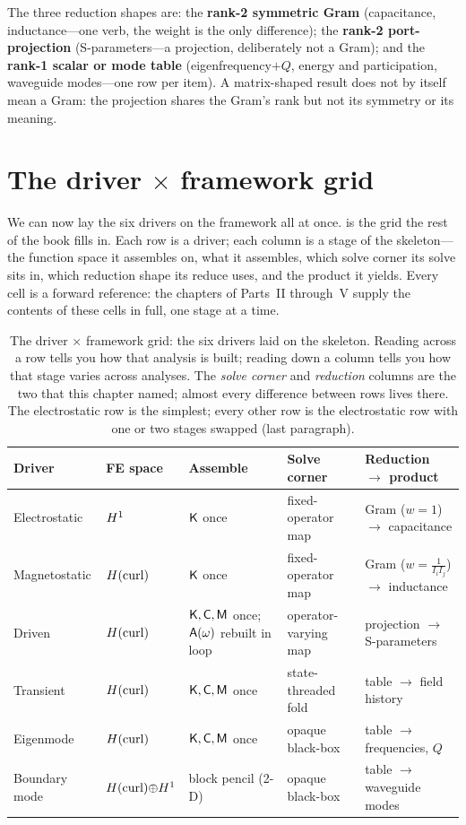 \begin{keyidea}
The three reduction shapes are: the \textbf{rank-2 symmetric Gram} (capacitance,
inductance---one verb, the weight is the only difference); the \textbf{rank-2
port-projection} (S-parameters---a projection, deliberately not a Gram); and the
\textbf{rank-1 scalar or mode table} (eigenfrequency$+Q$, energy and
participation, waveguide modes---one row per item). A matrix-shaped result does
not by itself mean a Gram: the projection shares the Gram's rank but not its
symmetry or its meaning.
\end{keyidea}

\section{The driver \texorpdfstring{$\times$}{x} framework grid}

We can now lay the six drivers on the framework all at once. 
is the grid the rest of the book fills in. Each row is a driver; each column is
a stage of the skeleton---the function space it assembles on, what it assembles,
which solve corner its solve sits in, which reduction shape its reduce uses, and
the product it yields. Every cell is a forward reference: the chapters of
Parts~II through~V supply the contents of these cells in full, one stage at a
time.

\begin{table}[t]
\centering
\caption[The driver $\times$ framework grid]{The driver $\times$ framework grid:
the six drivers laid on the skeleton. Reading across a row tells you how that
analysis is built; reading down a column tells you how that stage varies across
analyses. The \emph{solve corner} and \emph{reduction} columns are the two that
this chapter named; almost every difference between rows lives there. The
electrostatic row is the simplest; every other row is the electrostatic row
with one or two stages swapped (last paragraph).}
\label{tab:grid}
\footnotesize
\setlength{\tabcolsep}{3.5pt}
\renewcommand{\arraystretch}{1.3}
\begin{tabular}{@{}llp{27mm}ll@{}}
\toprule
Driver & FE space & \multicolumn{1}{l}{Assemble} & Solve corner & Reduction $\to$ product \\
\midrule
Electrostatic & $H^1$ & $\mathsf{K}$ once
  & fixed-operator map & Gram ($w{=}1$) $\to$ capacitance \\
Magnetostatic & $H(\mathrm{curl})$ & $\mathsf{K}$ once
  & fixed-operator map & Gram ($w{=}\tfrac{1}{I_iI_j}$) $\to$ inductance \\
Driven & $H(\mathrm{curl})$ & $\mathsf{K},\mathsf{C},\mathsf{M}$ once; $\mathsf{A}(\omega)$ rebuilt in loop
  & operator-varying map & projection $\to$ S-parameters \\
Transient & $H(\mathrm{curl})$ & $\mathsf{K},\mathsf{C},\mathsf{M}$ once
  & state-threaded fold & table $\to$ field history \\
Eigenmode & $H(\mathrm{curl})$ & $\mathsf{K},\mathsf{C},\mathsf{M}$ once
  & opaque black-box & table $\to$ frequencies, $Q$ \\
Boundary mode & $H(\mathrm{curl}){\oplus}H^1$ & block pencil (2-D)
  & opaque black-box & table $\to$ waveguide modes \\
\bottomrule
\end{tabular}
\end{table}

